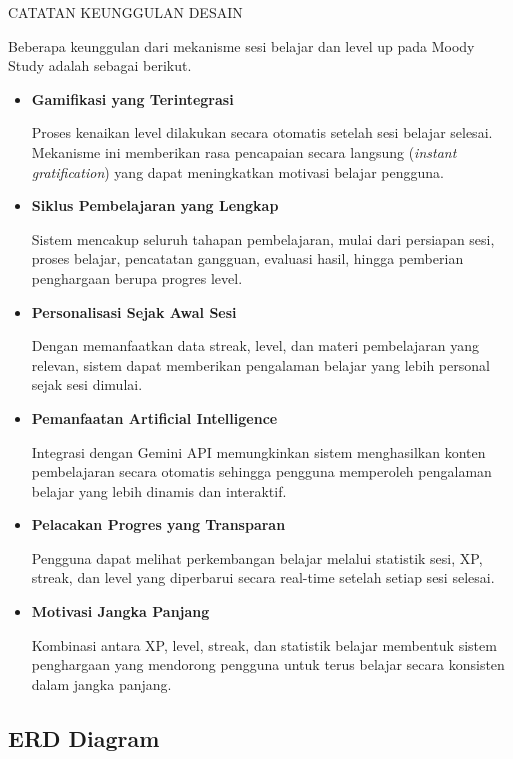 \documentclass[11pt]{article}
\begin{document}
CATATAN KEUNGGULAN DESAIN

Beberapa keunggulan dari mekanisme sesi belajar dan level up pada Moody Study adalah sebagai berikut.

\begin{itemize}

\item \textbf{Gamifikasi yang Terintegrasi}

Proses kenaikan level dilakukan secara otomatis setelah sesi belajar selesai. Mekanisme ini memberikan rasa pencapaian secara langsung (\textit{instant gratification}) yang dapat meningkatkan motivasi belajar pengguna.

\item \textbf{Siklus Pembelajaran yang Lengkap}

Sistem mencakup seluruh tahapan pembelajaran, mulai dari persiapan sesi, proses belajar, pencatatan gangguan, evaluasi hasil, hingga pemberian penghargaan berupa progres level.

\item \textbf{Personalisasi Sejak Awal Sesi}

Dengan memanfaatkan data streak, level, dan materi pembelajaran yang relevan, sistem dapat memberikan pengalaman belajar yang lebih personal sejak sesi dimulai.

\item \textbf{Pemanfaatan Artificial Intelligence}

Integrasi dengan Gemini API memungkinkan sistem menghasilkan konten pembelajaran secara otomatis sehingga pengguna memperoleh pengalaman belajar yang lebih dinamis dan interaktif.

\item \textbf{Pelacakan Progres yang Transparan}

Pengguna dapat melihat perkembangan belajar melalui statistik sesi, XP, streak, dan level yang diperbarui secara real-time setelah setiap sesi selesai.

\item \textbf{Motivasi Jangka Panjang}

Kombinasi antara XP, level, streak, dan statistik belajar membentuk sistem penghargaan yang mendorong pengguna untuk terus belajar secara konsisten dalam jangka panjang.

\end{itemize}


\subsection{ERD Diagram}
\end{document}
